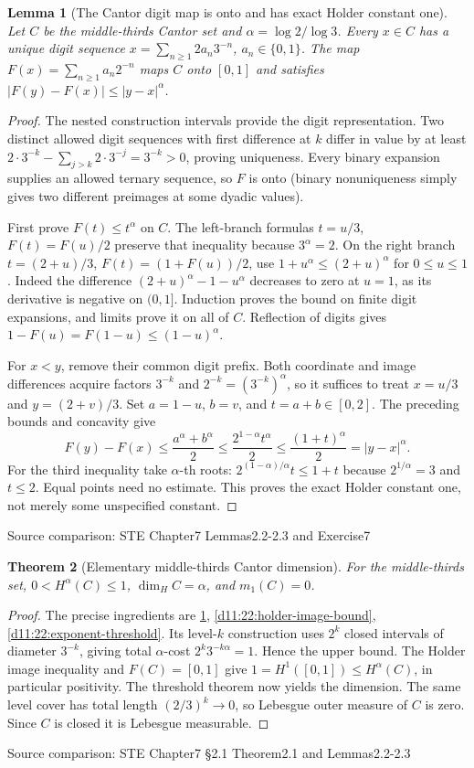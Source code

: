 \documentclass[11pt,oneside,openany]{book}
\newtheorem{theorem}{Theorem}[chapter]
\newtheorem{lemma}[theorem]{Lemma}
\theoremstyle{definition}
\theoremstyle{remark}
\newcommand{\family}[1]{}
\newcommand{\source}[1]{\par\begingroup\small\sffamily\color{black!65}Source comparison: #1\par\endgroup}
\begin{document}
\begin{lemma}[The Cantor digit map is onto and has exact Holder constant one]\family{D11.22.cantor_holder_surjection}\label{d11:22:cantor-holder-surjection}
Let $C$ be the middle-thirds Cantor set and $\alpha=\log2/\log3$. Every $x\in C$ has a unique digit sequence $x=\sum_{n\ge1}2a_n3^{-n}$, $a_n\in\{0,1\}$. The map $F(x)=\sum_{n\ge1}a_n2^{-n}$ maps $C$ onto $[0,1]$ and satisfies $|F(y)-F(x)|\le|y-x|^\alpha$.
\end{lemma}
\begin{proof}
The nested construction intervals provide the digit representation. Two distinct allowed digit sequences with first difference at $k$ differ in value by at least $2\cdot3^{-k}-\sum_{j>k}2\cdot3^{-j}=3^{-k}>0$, proving uniqueness. Every binary expansion supplies an allowed ternary sequence, so $F$ is onto (binary nonuniqueness simply gives two different preimages at some dyadic values).

First prove $F(t)\le t^\alpha$ on $C$. The left-branch formulas $t=u/3$, $F(t)=F(u)/2$ preserve that inequality because $3^\alpha=2$. On the right branch $t=(2+u)/3$, $F(t)=(1+F(u))/2$, use
$1+u^\alpha\le(2+u)^\alpha$ for $0\le u\le1$.
Indeed the difference $(2+u)^\alpha-1-u^\alpha$ decreases to zero at $u=1$, as its derivative is negative on $(0,1]$. Induction proves the bound on finite digit expansions, and limits prove it on all of $C$. Reflection of digits gives $1-F(u)=F(1-u)\le(1-u)^\alpha$.

For $x<y$, remove their common digit prefix. Both coordinate and image differences acquire factors $3^{-k}$ and $2^{-k}=(3^{-k})^\alpha$, so it suffices to treat $x=u/3$ and $y=(2+v)/3$. Set $a=1-u$, $b=v$, and $t=a+b\in[0,2]$. The preceding bounds and concavity give
\[F(y)-F(x)\le\frac{a^\alpha+b^\alpha}{2}
\le\frac{2^{1-\alpha}t^\alpha}{2}
\le\frac{(1+t)^\alpha}{2}=|y-x|^\alpha.
\]
For the third inequality take $\alpha$-th roots: $2^{(1-\alpha)/\alpha}t\le1+t$ because $2^{1/\alpha}=3$ and $t\le2$. Equal points need no estimate. This proves the exact Holder constant one, not merely some unspecified constant.
\end{proof}
\source{STE Chapter7 Lemmas2.2-2.3 and Exercise7}

\begin{theorem}[Elementary middle-thirds Cantor dimension]\family{D11.22.cantor_dimension}\label{d11:22:cantor-dimension}
For the middle-thirds set, $0<H^\alpha(C)\le1$, $\dim_HC=\alpha$, and $m_1(C)=0$.
\end{theorem}
\begin{proof}
The precise ingredients are \cref{d11:22:cantor-holder-surjection}, \cref{d11:22:holder-image-bound}, \cref{d11:22:exponent-threshold}. Its level-$k$ construction uses $2^k$ closed intervals of diameter $3^{-k}$, giving total $\alpha$-cost $2^k3^{-k\alpha}=1$. Hence the upper bound. The Holder image inequality and $F(C)=[0,1]$ give $1=H^1([0,1])\le H^\alpha(C)$, in particular positivity. The threshold theorem now yields the dimension. The same level cover has total length $(2/3)^k\to0$, so Lebesgue outer measure of $C$ is zero. Since $C$ is closed it is Lebesgue measurable.
\end{proof}
\source{STE Chapter7 §2.1 Theorem2.1 and Lemmas2.2-2.3}
\end{document}
